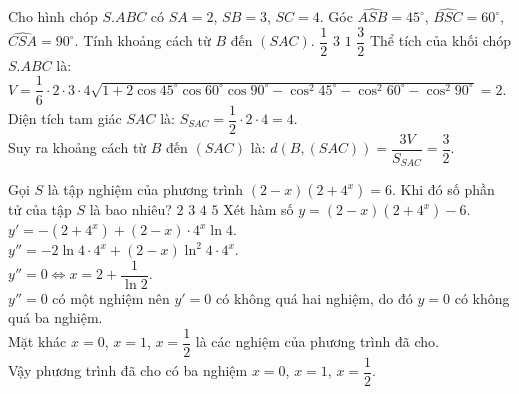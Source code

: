 \begin{ex}%
 Cho hình chóp $S.ABC$ có $SA = 2$, $SB = 3$, $SC = 4$. Góc $\widehat{ASB} = 45^\circ$, $\widehat{BSC} = 60^\circ$, $\widehat{CSA} = 90^\circ$. Tính khoảng cách từ $B$ đến $(SAC)$.
 \choice
  {$\dfrac{1}{2}$}
  {$3$}
  {$1$}
  {\True $\dfrac{3}{2}$}
 \loigiai
  {
  Thể tích của khối chóp $S.ABC$ là:\\
  $V = \dfrac{1}{6} \cdot 2 \cdot 3 \cdot 4 \sqrt{1 + 2\cos 45^\circ \cos 60^\circ \cos 90^\circ - \cos^2 45^\circ - \cos^2 {60^\circ} - \cos^2 90^\circ} = 2$.\\
  Diện tích tam giác $SAC$ là: $S_{SAC} = \dfrac{1}{2} \cdot 2 \cdot 4 = 4$.\\
  Suy ra khoảng cách từ $B$ đến $(SAC)$ là: $d(B,(SAC)) = \dfrac{3V}{S_{SAC}} = \dfrac{3}{2}$.
  }
\end{ex}


\begin{ex}%
 Gọi $S$ là tập nghiệm của phương trình $(2 - x)(2 + 4^x) = 6$. Khi đó số phần tử của tập $S$ là bao nhiêu?
 \choice
  {$2$}
  {\True $3$}
  {$4$}
  {$5$}
 \loigiai
  {
  Xét hàm số $y = (2-x)(2+4^x)-6$.\\
  $y' = -(2+4^x) + (2-x)\cdot 4^x \ln 4$.\\
  $y'' = -2\ln4\cdot 4^x + (2-x)\ln^2 4 \cdot 4^x$.\\
  $y'' = 0 \Leftrightarrow x = 2 + \dfrac{1}{\ln 2}$.\\
  $y'' = 0$ có một nghiệm nên $y' = 0$ có không quá hai nghiệm, do đó $y = 0$ có không quá ba nghiệm.\\
  Mặt khác $x = 0$, $x = 1$, $x = \dfrac{1}{2}$ là các nghiệm của phương trình đã cho.\\
  Vậy phương trình đã cho có ba nghiệm $x = 0$, $x = 1$, $x = \dfrac{1}{2}$.
  }
\end{ex}


